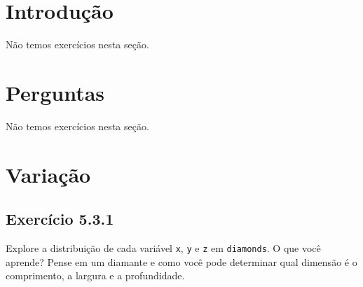 \documentclass[
]{latex/krantz}
\theoremstyle{definition}
\theoremstyle{definition}
\theoremstyle{definition}
\theoremstyle{definition}
\theoremstyle{remark}
\begin{document}
\hypertarget{introduuxe7uxe3o-2}{%
\section{Introdução}\label{introduuxe7uxe3o-2}}

Não temos exercícios nesta seção.

\hypertarget{perguntas}{%
\section{Perguntas}\label{perguntas}}

Não temos exercícios nesta seção.

\hypertarget{variauxe7uxe3o}{%
\section{Variação}\label{variauxe7uxe3o}}

\hypertarget{exr5-3-1}{%
\subsection*{Exercício 5.3.1}\label{exr5-3-1}}

Explore a distribuição de cada variável \texttt{x}, \texttt{y} e \texttt{z} em \texttt{diamonds}. O que você aprende? Pense em um diamante e como você pode determinar qual dimensão é o comprimento, a largura e a profundidade.
\end{document}
